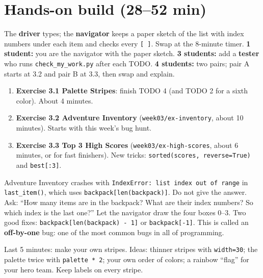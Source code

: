\section{Hands-on build (28--52 min)}
\begin{pairroles}
The \textbf{driver} types; the \textbf{navigator} keeps a paper sketch of the list with index numbers under each item and
checks every \texttt{[ ]}. Swap at the 8-minute timer.
\textbf{1 student:} you are the navigator with the paper sketch. \textbf{3 students:} add a \textbf{tester} who runs
\texttt{check\_my\_work.py} after each TODO. \textbf{4 students:} two pairs; pair A starts at 3.2 and pair B at 3.3, then swap and explain.
\end{pairroles}

\begin{enumerate}[leftmargin=1.4em]
  \item \textbf{Exercise 3.1 Palette Stripes}: finish TODO 4 (and TODO 2 for a sixth color). About 4 minutes.
  \item \textbf{Exercise 3.2 Adventure Inventory} (\texttt{week03/ex-inventory}, about 10 minutes). Starts with this week's bug hunt.
  \item \textbf{Exercise 3.3 Top 3 High Scores} (\texttt{week03/ex-high-scores}, about 6 minutes, or for fast finishers).
        New tricks: \texttt{sorted(scores, reverse=True)} and \texttt{best[:3]}.
\end{enumerate}

\begin{bughunt}
Adventure Inventory crashes with \texttt{IndexError: list index out of range} in \texttt{last\_item()}, which uses
\texttt{backpack[len(backpack)]}. Do not give the answer. Ask: \enquote{How many items are in the backpack? What are their index
numbers? So which index is the last one?} Let the navigator draw the four boxes 0--3. Two good fixes: \texttt{backpack[len(backpack) - 1]}
or \texttt{backpack[-1]}. This is called an \textbf{off-by-one} bug: one of the most common bugs in all of programming.
\end{bughunt}

\begin{freebuild}
Last 5 minutes: make your own stripes. Ideas: thinner stripes with \texttt{width=30}; the palette twice with \texttt{palette * 2};
your own order of colors; a rainbow \enquote{flag} for your hero team. Keep labels on every stripe.
\end{freebuild}


